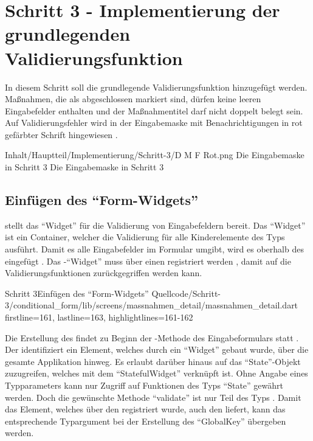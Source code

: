 \chapter{Schritt 3 - Implementierung der grundlegenden Validierungsfunktion}
\label{chap:Schritt-3}


In diesem Schritt soll die grundlegende Validierungsfunktion hinzugefügt werden.
Maßnahmen, die als abgeschlossen markiert sind, dürfen keine leeren Eingabefelder enthalten und der Maßnahmentitel darf nicht doppelt belegt sein.
Auf Validierungsfehler wird in der Eingabemaske mit Benachrichtigungen in rot gefärbter Schrift hingewiesen \Abb{\ref{fig:Schritt3Eingabemaske}}.
  
  \begin{alexfigure}{Inhalt/Hauptteil/Implementierung/Schritt-3/D M F Rot.png}
    {Die Eingabemaske in Schritt 3}
    {Die Eingabemaske in Schritt 3}
  
    \label{fig:Schritt3Eingabemaske}
  
  \end{alexfigure}


\section{Einfügen des \enquote{Form-Widgets}}
 stellt das \enquote{Widget}  für die Validierung von Eingabefeldern bereit.
Das \enquote{Widget}  ist ein Container, welcher die Validierung für alle Kinderelemente des Typs  ausführt.
Damit es alle Eingabefelder im Formular umgibt, wird es oberhalb des  eingefügt .
Das -\enquote{Widget} muss über einen  registriert werden , damit auf die Validierungsfunktionen zurückgegriffen werden kann.

\begin{alexlisting}{Schritt 3}{Einfügen des \enquote{Form-Widgets}}
    {Quellcode/Schritt-3/conditional_form/lib/screens/massnahmen_detail/massnahmen_detail.dart}
    {firstline=161, lastline=163, highlightlines={161-162}}
    \label{lst:Schritt3Form}
\end{alexlisting}



  
Die Erstellung des  findet zu Beginn der -Methode des Eingabeformulars statt .
Der  identifiziert ein Element, welches durch ein \enquote{Widget} gebaut wurde, über die gesamte Applikation hinweg.
Es erlaubt darüber hinaus auf das \enquote{State}-Objekt zuzugreifen, welches mit dem \enquote{StatefulWidget} verknüpft ist.
Ohne Angabe eines Typparameters kann nur Zugriff auf Funktionen des Typs \enquote{State} gewährt werden.
Doch die gewünschte Methode \enquote{validate} ist nur Teil des Typs .
Damit das Element, welches über den  registriert wurde, auch den  liefert,
kann das entsprechende Typargument  bei der Erstellung des \enquote{GlobalKey} übergeben werden.

